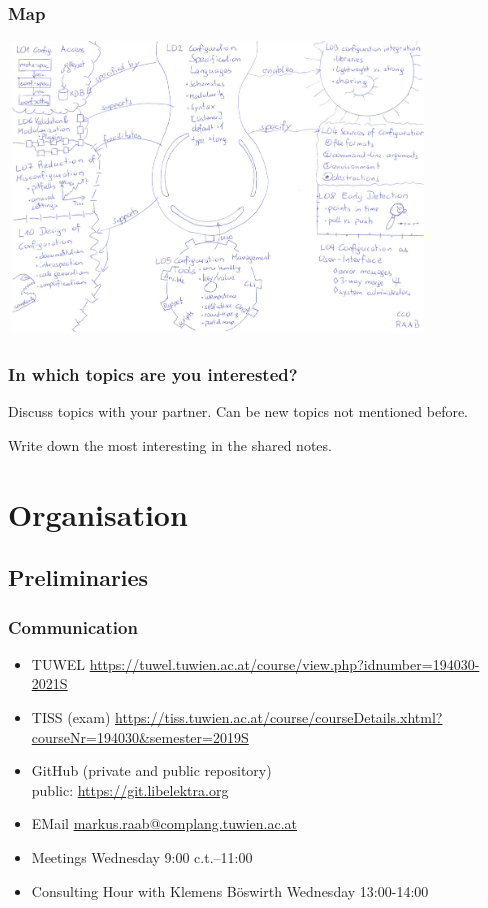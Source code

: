 \begin{frame}
	\frametitle{Map}

	\includegraphics[width=11cm]{pics/map.pdf}
\end{frame}

\begin{assignment}
	\frametitle{In which topics are you interested?}
	\begin{task}[1]
	Discuss topics with your partner.
	Can be new topics not mentioned before.
	\end{task}

	\begin{task}[2]
	Write down the most interesting in the shared notes.
	\end{task}
\end{assignment}





\section{Organisation}

\subsection{Preliminaries}
\begin{frame}
	\frametitle{Communication}
	\begin{itemize}
		\item TUWEL \url{https://tuwel.tuwien.ac.at/course/view.php?idnumber=194030-2021S}
		\item TISS (exam) \url{https://tiss.tuwien.ac.at/course/courseDetails.xhtml?courseNr=194030&semester=2019S}
		\item GitHub (private and public repository) \\ public: \url{https://git.libelektra.org}
		\item EMail \url{markus.raab@complang.tuwien.ac.at}
		\item Meetings Wednesday 9:00 c.t.--11:00
		\item Consulting Hour with Klemens Böswirth Wednesday 13:00-14:00
	\end{itemize}
\end{frame}

